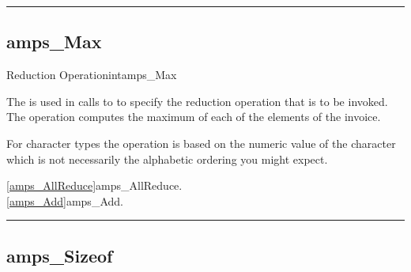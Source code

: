 
\noindent\rule{\textwidth}{1mm}

\subsection{amps\_Max}
\label{amps_Max}

\begin{deftypevr}{Reduction Operation}{int}{amps\_Max}
\DESCRIPTION

The  is used in calls to  to 
specify the reduction operation that is to be invoked.  The 
operation computes the maximum of each of the elements of the
invoice.  

\NOTES
For character types the  operation is based on the numeric
value of the character which is not necessarily the alphabetic ordering
you might expect.

\SEEALSO
\vref{amps_AllReduce}{amps\_AllReduce}. \\
\vref{amps_Add}{amps\_Add}. \\

\end{deftypevr}


\noindent\rule{\textwidth}{1mm}

\subsection{amps\_Sizeof}
\label{amps_SizeofType}

